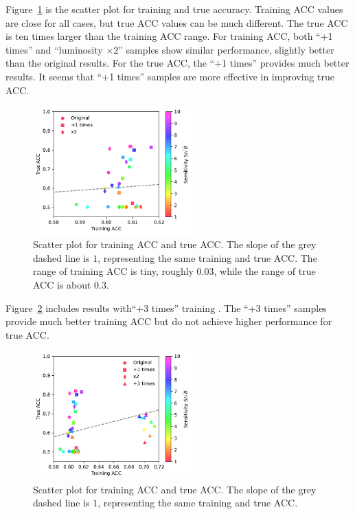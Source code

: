 \documentclass[12pt]{article}
\begin{document}
		Figure~\ref{fig:training_and_true_acc_ori_aug_1_x2} is the scatter plot for training and true accuracy. Training ACC values are close for all cases, but true ACC values can be much different. The true ACC is ten times larger than the training ACC range. For training ACC, both ``+1 times'' and ``luminosity $\times 2$'' samples show similar performance, slightly better than the original results. For the true ACC, the ``+1 times'' provides much better results. It seems that ``+1 times'' samples are more effective in improving true ACC.
		\begin{figure}[htpb]
			\centering
			\includegraphics[width=0.55\textwidth]{HVmodel_training_true_acc_aug_1_x2.pdf}
			\caption{Scatter plot for training ACC and true ACC. The slope of the grey dashed line is $1$, representing the same training and true ACC. The range of training ACC is tiny, roughly 0.03, while the range of true ACC is about 0.3.}
			\label{fig:training_and_true_acc_ori_aug_1_x2}
		\end{figure}

		Figure~\ref{fig:training_and_true_acc_ori_aug_1_3_x2} includes results with``+3 times'' training . The ``+3 times'' samples provide much better training ACC but do not achieve higher performance for true ACC.
		\begin{figure}[htpb]
			\centering
			\includegraphics[width=0.55\textwidth]{HVmodel_training_true_acc_aug_1_3_x2.pdf}
			\caption{Scatter plot for training ACC and true ACC. The slope of the grey dashed line is $1$, representing the same training and true ACC.}
			\label{fig:training_and_true_acc_ori_aug_1_3_x2}
		\end{figure}
\end{document}

